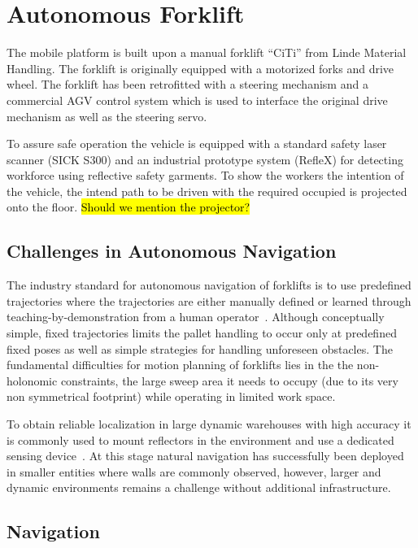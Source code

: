 \section{Autonomous Forklift}
\label{sec:agv}
%

The mobile platform is built upon a manual forklift ``CiTi'' from
Linde Material Handling. The forklift is originally equipped with a
motorized forks and drive wheel. The forklift has been retrofitted
with a steering mechanism and a commercial AGV control system which is
used to interface the original drive mechanism as well as the steering
servo.

To assure safe operation the vehicle is equipped with a standard safety
laser scanner (SICK S300) and an industrial prototype system (RefleX) for
detecting workforce using reflective safety garments. To show the workers the intention of the vehicle, the intend path to be driven with the required occupied is projected onto the floor. \hl{Should we mention the projector?}

%
\subsection{Challenges in Autonomous Navigation}
\label{subsec:AGV_challenges}

The industry standard for autonomous navigation of forklifts is to use predefined
trajectories where the trajectories are either
manually defined or learned through teaching-by-demonstration from a human
operator~\cite{Hell06,Marsh08}.
Although conceptually simple, fixed trajectories limits the pallet handling to occur only at predefined fixed poses as well as simple strategies for handling unforeseen obstacles.
The fundamental difficulties for motion planning of forklifts lies in the the non-holonomic constraints, the large sweep area it needs to occupy (due to its very non symmetrical footprint) while operating in limited work space.

To obtain reliable localization in large dynamic warehouses with high accuracy it is commonly used to mount reflectors in the environment and use a dedicated sensing device~\cite{Hyyp89}. At this stage natural navigation has successfully been deployed in smaller entities where walls are commonly observed, however, larger and dynamic environments remains a challenge without additional infrastructure.


\subsection{Navigation}
\label{subsec:navigation}
%

